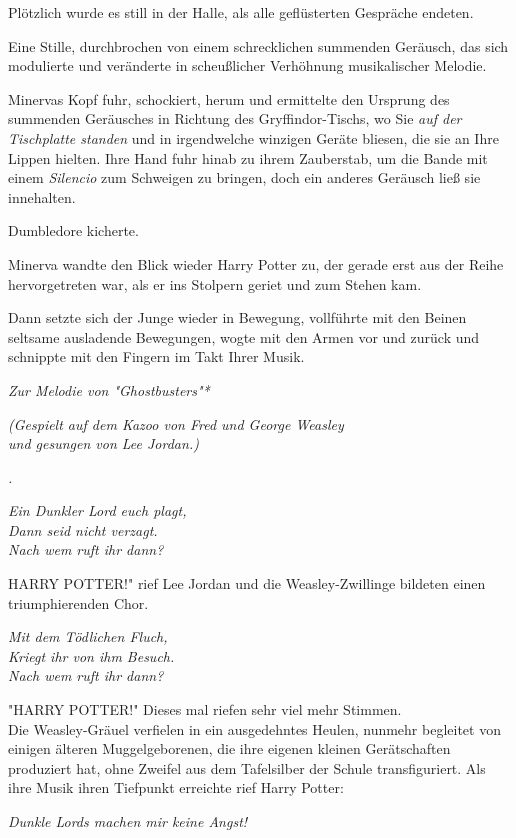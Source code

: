 {Plötzlich wurde es still in der Halle, als alle geflüsterten Gespräche endeten.

Eine Stille, durchbrochen von einem schrecklichen summenden Geräusch, das sich modulierte und veränderte in scheußlicher Verhöhnung musikalischer Melodie.

Minervas Kopf fuhr, schockiert, herum und ermittelte den Ursprung des summenden Geräusches in Richtung des Gryffindor-Tischs, wo Sie \emph{auf der Tischplatte standen} und in irgendwelche winzigen Geräte bliesen, die sie an Ihre Lippen hielten. Ihre Hand fuhr hinab zu ihrem Zauberstab, um die Bande mit einem \emph{Silencio} zum Schweigen zu bringen, doch ein anderes Geräusch ließ sie innehalten.

Dumbledore kicherte.

Minerva wandte den Blick wieder Harry Potter zu, der gerade erst aus der Reihe hervorgetreten war, als er ins Stolpern geriet und zum Stehen kam.

Dann setzte sich der Junge wieder in Bewegung, vollführte mit den Beinen seltsame ausladende Bewegungen, wogte mit den Armen vor und zurück und schnippte mit den Fingern im Takt Ihrer Musik.

\emph{Zur Melodie von "Ghostbusters"*}

\emph{(Gespielt auf dem Kazoo von Fred und George Weasley\\ und gesungen von Lee Jordan.)}

\emph{.}

\emph{Ein Dunkler Lord euch plagt,\\ Dann seid nicht verzagt.\\ Nach wem ruft ihr dann?}

HARRY POTTER!" rief Lee Jordan und die Weasley-Zwillinge bildeten einen triumphierenden Chor.

\emph{Mit dem Tödlichen Fluch,\\ Kriegt ihr von ihm Besuch.\\ Nach wem ruft ihr dann?}

"HARRY POTTER!" Dieses mal riefen sehr viel mehr Stimmen.\\ Die Weasley-Gräuel verfielen in ein ausgedehntes Heulen, nunmehr begleitet von einigen älteren Muggelgeborenen, die ihre eigenen kleinen Gerätschaften produziert hat, ohne Zweifel aus dem Tafelsilber der Schule transfiguriert. Als ihre Musik ihren Tiefpunkt erreichte rief Harry Potter:

\emph{\emph{Dunkle Lords machen mir keine Angst!}}

}
